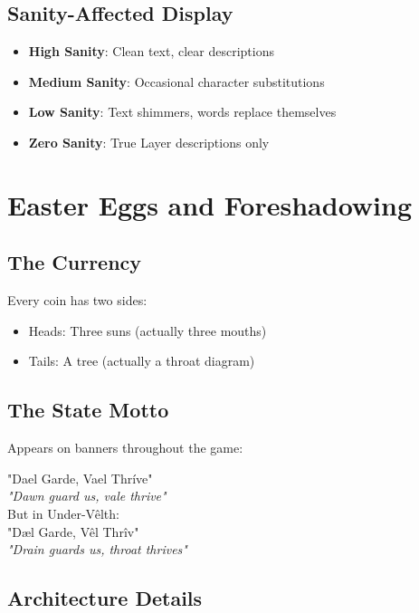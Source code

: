 \documentclass[11pt,a4paper,twoside]{book}
\begin{document}
\subsection{Sanity-Affected Display}

\begin{itemize}
    \item \textbf{High Sanity}: Clean text, clear descriptions
    \item \textbf{Medium Sanity}: Occasional character substitutions
    \item \textbf{Low Sanity}: Text shimmers, words replace themselves
    \item \textbf{Zero Sanity}: True Layer descriptions only
\end{itemize}

\section{Easter Eggs and Foreshadowing}

\subsection{The Currency}

Every coin has two sides:
\begin{itemize}
    \item Heads: Three suns (actually three mouths)
    \item Tails: A tree (actually a throat diagram)
\end{itemize}

\subsection{The State Motto}

Appears on banners throughout the game:
\begin{center}
\Large
"Dael Garde, Vael Thríve"\\
\normalsize
\textit{"Dawn guard us, vale thrive"}\\
\vspace{0.5em}
But in Under-Vêlth:\\
\Large
"Dæl Garde, Vêl Thrîv"\\
\normalsize
\textit{"Drain guards us, throat thrives"}
\end{center}

\subsection{Architecture Details}
\end{document}
